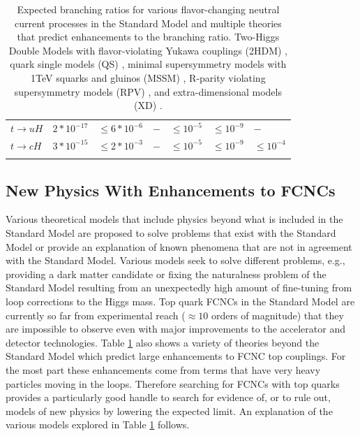 \begin{table}[]
\begin{center}
\begin{tabular}{lllllll}
$t\rightarrow u H                    $ & $ 2*10^{-17} $  & $ \leq 6*10^{-6} $ & $ -                      $ & $ \leq 10^{-5} $ & $ \leq 10^{-9} $     & $ -    $                                           \\
$t\rightarrow c H                    $ & $ 3*10^{-15} $  & $ \leq 2*10^{-3} $ & $ -                      $ & $ \leq 10^{-5} $ & $ \leq 10^{-9} $     & $ \leq 10^{-4} $ \\
\hhline{=======}
\end{tabular}
	\caption[Expected branching ratios for various flavor-changing neutral current processes in the Standard Model and multiple theories that predict enhancements to the branching ratio.  Two-Higgs Double Models with flavor-violating Yukawa couplings (2HDM), quark single models (QS), minimal supersymmetry models with 1TeV squarks and gluinos (MSSM), R-parity violating supersymmetry models (RPV), and extra-dimensional models (XD).]{Expected branching ratios for various flavor-changing neutral current processes in the Standard Model\cite{2HDM-2} and multiple theories that predict enhancements to the branching ratio.  Two-Higgs Double Models with flavor-violating Yukawa couplings (2HDM) \cite{2HDM-2,2HDM-3}, quark single models (QS) \cite{QS-1,QS-2}, minimal supersymmetry models with 1TeV squarks and gluinos (MSSM) \cite{MSSM}, R-parity violating supersymmetry models (RPV) \cite{RPVSusyFCNC}, and extra-dimensional models (XD) \cite{XDFCNC}.}
	\label{tab:FCNCLimits}
\end{center}
\end{table}

\subsection{New Physics With Enhancements to FCNCs}
\label{sec:bsmFCNC}
Various theoretical models that include physics beyond what is included in the Standard Model are proposed to solve problems that exist with the Standard Model or provide an explanation of known phenomena that are not in agreement with the Standard Model.  Various models seek to solve different problems, e.g., providing a dark matter candidate or fixing the naturalness problem of the Standard Model resulting from an unexpectedly high amount of fine-tuning from loop corrections to the Higgs mass.  
Top quark FCNCs in the Standard Model are currently so far from experimental reach ($\approx 10$ orders of magnitude) that they are impossible to observe even with major improvements to the accelerator and detector technologies.  Table \ref{tab:FCNCLimits} also shows a variety of theories beyond the Standard Model which predict large enhancements to FCNC top couplings.  For the most part these enhancements come from terms that have very heavy particles moving in the loops.  Therefore searching for FCNCs with top quarks provides a particularly good handle to search for evidence of, or to rule out, models of new physics by lowering the expected limit.  An explanation of the various models explored in Table \ref{tab:FCNCLimits} follows.


